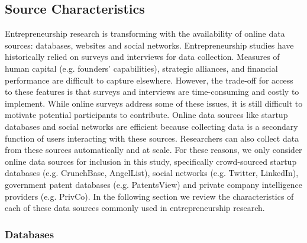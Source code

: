 \documentclass[../thesis/thesis.tex]{subfiles}
\begin{document}

\subsection{Source Characteristics}

Entrepreneurship research is transforming with the availability of online data sources: databases, websites and social networks. Entrepreneurship studies have historically relied on surveys and interviews for data collection. Measures of human capital (e.g. founders' capabilities), strategic alliances, and financial performance are difficult to capture elsewhere. However, the trade-off for access to these features is that surveys and interviews are time-consuming and costly to implement. While online surveys address some of these issues, it is still difficult to motivate potential participants to contribute. Online data sources like startup databases and social networks are efficient because collecting data is a secondary function of users interacting with these sources. Researchers can also collect data from these sources automatically and at scale. For these reasons, we only consider online data sources for inclusion in this study, specifically crowd-sourced startup databases (e.g. CrunchBase, AngelList), social networks (e.g. Twitter, LinkedIn), government patent databases (e.g. PatentsView) and private company intelligence providers (e.g. PrivCo). In the following section we review the characteristics of each of these data sources commonly used in entrepreneurship research.

\subsubsection{Databases}
\end{document}
